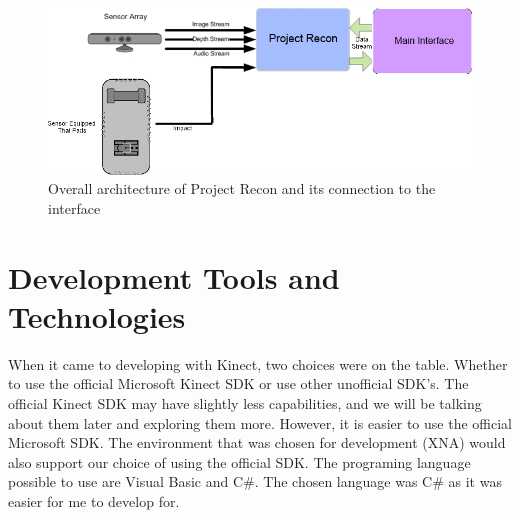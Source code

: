 \begin{figure}[!htbp]
\centering
\includegraphics[width=1\textwidth]{images/general_overview.png}
\caption{Overall architecture of Project Recon and its connection to the interface}
\label{generaloverview}
\end{figure}

\section{Development Tools and Technologies}
When it came to developing with Kinect, two choices were on the table. Whether to use the official Microsoft Kinect SDK or use other unofficial SDK's. The official Kinect SDK may have slightly less capabilities, and we will be talking about them later and exploring them more. However, it is easier to use the official Microsoft SDK. The environment that was chosen for development (XNA) would also support our choice of using the official SDK. The programing language possible to use are Visual Basic and C\#. The chosen language was C\# as it was easier for me to develop for.

